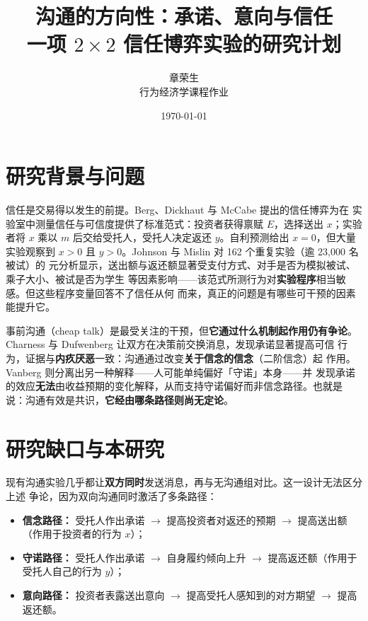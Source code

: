 \documentclass[10pt,a4paper]{ctexart}
\title{\vspace{-1.8em}\bfseries 沟通的方向性：承诺、意向与信任\\[2pt]
\large 一项 $2\times2$ 信任博弈实验的研究计划}
\author{章荣生\quad202621150313\\[1pt] \small 行为经济学课程作业}
\date{\today}
\begin{document}
\maketitle
\vspace{-2.4em}

\section{研究背景与问题}

信任是交易得以发生的前提。Berg、Dickhaut 与 McCabe\cite{berg1995} 提出的信任博弈为在
实验室中测量信任与可信度提供了标准范式：投资者获得禀赋 $E$，选择送出 $x$；实验者将 $x$
乘以 $m$ 后交给受托人，受托人决定返还 $y$。自利预测给出 $x=0$，但大量实验观察到 $x>0$
且 $y>0$。Johnson 与 Mislin\cite{johnson2011} 对 162 个重复实验（逾 23{,}000 名被试）的
元分析显示，送出额与返还额显著受支付方式、对手是否为模拟被试、乘子大小、被试是否为学生
等因素影响——该范式所测行为对\textbf{实验程序}相当敏感。但这些程序变量回答不了信任从何
而来，真正的问题是有哪些可干预的因素能提升它。

事前沟通（cheap talk）是最受关注的干预，但\textbf{它通过什么机制起作用仍有争论}。
Charness 与 Dufwenberg\cite{charness2006} 让双方在决策前交换消息，发现承诺显著提高可信
行为，证据与\textbf{内疚厌恶}一致：沟通通过改变\textbf{关于信念的信念}（二阶信念）起
作用。Vanberg\cite{vanberg2008} 则分离出另一种解释——人可能单纯偏好「守诺」本身——并
发现承诺的效应\textbf{无法}由收益预期的变化解释，从而支持守诺偏好而非信念路径。也就是
说：沟通有效是共识，\textbf{它经由哪条路径则尚无定论}。

\section{研究缺口与本研究}

现有沟通实验几乎都让\textbf{双方同时}发送消息，再与无沟通组对比。这一设计无法区分上述
争论，因为双向沟通同时激活了多条路径：

\begin{itemize}
  \item \textbf{信念路径：} 受托人作出承诺 $\rightarrow$ 提高投资者对返还的预期
        $\rightarrow$ 提高送出额（作用于投资者的行为 $x$）；
  \item \textbf{守诺路径：} 受托人作出承诺 $\rightarrow$ 自身履约倾向上升
        $\rightarrow$ 提高返还额（作用于受托人自己的行为 $y$）；
  \item \textbf{意向路径：} 投资者表露送出意向 $\rightarrow$ 提高受托人感知到的对方期望
        $\rightarrow$ 提高返还额。
\end{itemize}
\end{document}
